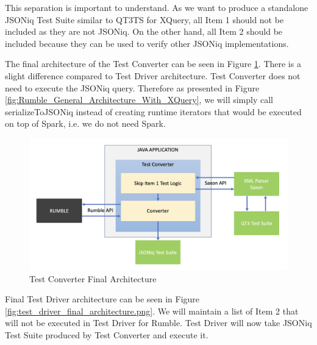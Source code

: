 This separation is important to understand. As we want to produce a standalone JSONiq Test Suite similar to QT3TS for XQuery, all Item 1 should not be included as they are not JSONiq. On the other hand, all Item 2 should be included because they can be used to verify other JSONiq implementations. 

The final architecture of the Test Converter can be seen in Figure \ref{fig:test_converter_final_architecture.png}. There is a slight difference compared to Test Driver architecture. Test Converter does not need to execute the JSONiq query. Therefore as presented in Figure \ref{fig:Rumble_General_Architecture_With_XQuery}, we will simply call serializeToJSONiq instead of creating runtime iterators that would be executed on top of Spark, i.e. we do not need Spark. 

\begin{figure}[h!]
	\vspace*{-5mm}
	\includegraphics[width=\linewidth]{test_converter_final_architecture.png}
	\vspace*{-8mm}
	\caption{Test Converter Final Architecture}
	\label{fig:test_converter_final_architecture.png}
\end{figure}

\vspace*{-4mm}
Final Test Driver architecture can be seen in Figure \ref{fig:test_driver_final_architecture.png}. We will maintain a list of Item 2 that will not be executed in Test Driver for Rumble. Test Driver will now take JSONiq Test Suite produced by Test Converter and execute it. 

